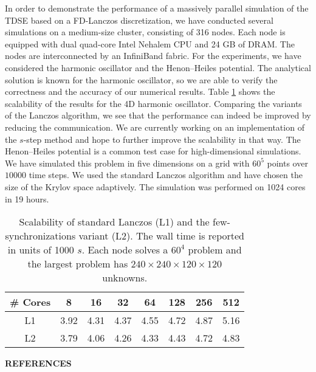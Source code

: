 \documentclass{report}
\begin{document}
In order to demonstrate the performance of a massively parallel
simulation of the TDSE based on a FD-Lanczos discretization, we have
conducted several simulations on a medium-size cluster, consisting of 316
nodes. Each node is equipped with dual quad-core Intel Nehalem CPU and 24
GB of DRAM. The nodes are interconnected by an InfiniBand fabric. For the
experiments, we have considered the harmonic oscillator and the
Henon--Heiles potential. The analytical solution is known for the
harmonic oscillator, so we are able to verify the correctness and the
accuracy of our numerical results. Table \ref{tab:1} shows the
scalability of the results for the 4D harmonic oscillator. Comparing the
variants of the Lanczos algorithm, we see that the performance can indeed
be improved by reducing the communication. We are currently working on an
implementation of the $s$-step method and hope to further improve the
scalability in that way. The Henon--Heiles potential is a common test
case for high-dimensional simulations. We have simulated this problem in
five dimensions on a grid with $60^5$ points over $10000$ time steps. We
used the standard Lanczos algorithm and have chosen the size of the
Krylov space adaptively. The simulation was performed on 1024 cores in 19
hours.

\begin{table}[htdp]
\caption{\footnotesize{Scalability of standard Lanczos (L1) and the
few-synchronizations variant (L2). The wall time is reported in units of
1000 $s$. Each node solves a $60^{4}$ problem and the largest problem has
$240 \times 240 \times 120 \times 120$ unknowns.}}
\begin{center}
\begin{tabular}{|c|c|c|c|c|c|c|c|}
\hline
\# Cores & 8 & 16 & 32 & 64 & 128 & 256 & 512 \\
\hline
L1& 3.92& 4.31& 4.37& 4.55& 4.72& 4.87& 5.16 \\
L2& 3.79& 4.06& 4.26& 4.33& 4.43& 4.72& 4.83 \\
\hline
\end{tabular}
\end{center}
\label{tab:1}
\end{table}%


\begin{center}
{\bf REFERENCES}\\[-3mm]
\end{center}
\end{document}

